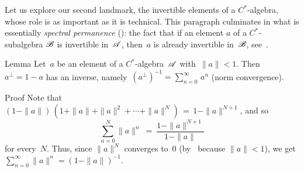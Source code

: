 \documentclass[main]{subfiles}
\begin{document}
%
%
\begin{parsec}%
\begin{point}%
Let us explore our second landmark,
the  invertible elements
of a $C^*$-algebra,
whose role 
is as important as it is technical.
This paragraph culminates in what is essentially
 \emph{spectral permanence} ():
the fact that if an element $a$ of a $C^*$-subalgebra $\mathscr{B}$
is invertible in~$\mathscr{A}$,
then~$a$ is already invertible in~$\mathscr{B}$,
see~.
\end{point}
\begin{point}[geometric]{Lemma}%
Let~$a$ be an element of a $C^*$-algebra~$\mathscr{A}$ with~$\|a\|<1$.
Then~$a^\perp=1-a$ has an inverse,
namely~$(a^\perp)^{-1}= \sum_{n=0}^\infty\, a^n$
(norm convergence).
\begin{point}{Proof}%
Note that
$(1-\|a\|)\,(1+\|a\|+\|a\|^2+\dotsb+\|a\|^N) \,=\, 1-\|a\|^{N+1}$,
and so 
\begin{equation*}
\sum_{n=0}^N \|a\|^n \ =\  \frac{1-\|a\|^{N+1}}{1-\|a\|}
\end{equation*}
for every~$N$.
Thus,
since $\|a\|^N$ converges to~$0$
(by~\TODO{} because $\|a\|<1$),
we  get $\sum_{n=0}^\infty \|a\|^n = (1-\|a\|)^{-1}$.


\end{point}
\end{point}
\end{parsec}
\end{document}
